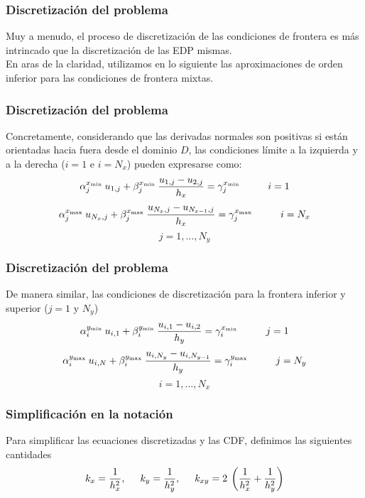 \begin{frame}
\frametitle{Discretización del problema}
Muy a menudo, el proceso de discretización de las condiciones de frontera es más intrincado que la discretización de las EDP mismas.
\\
\bigskip
En aras de la claridad, utilizamos en lo siguiente las aproximaciones de orden inferior para las condiciones de frontera mixtas.
\end{frame}
\begin{frame}
\frametitle{Discretización del problema}
Concretamente, considerando que las derivadas normales son positivas si están orientadas hacia fuera desde el dominio $D$, las condiciones límite a la izquierda y a la derecha ($i = 1$ e $i = N_{x}$) pueden expresarse como:
\[ \alpha_{j}^{x_{\text{\tiny{min}}}} \: u_{1, j} + \beta_{j}^{x_{\text{\tiny{min}}}} \: \dfrac{u_{1, j} - u_{2, j}}{h_{x}} = \gamma_{j}^{x_{\text{\tiny{min}}}} \hspace{1cm} i = 1  \]
\[ \alpha_{j}^{x_{\mbox{\tiny{max}}}} \: u_{N_{x}, j} + \beta_{j}^{x_{\text{\tiny{max}}}} \: \dfrac{u_{N_{x}, j} - u_{N_{x-1}, j}}{h_{x}} = \gamma_{j}^{x_{\text{\tiny{max}}}} \hspace{1cm} i = N_{x} \]
\[ j = 1, \ldots, N_{y}  \]
\end{frame}
\begin{frame}
\frametitle{Discretización del problema}
De manera similar, las condiciones de discretización para la frontera inferior y superior ($j = 1$ y $N_{y}$)
\[ \alpha_{i}^{y_{\text{\tiny{min}}}} \: u_{i, 1} + \beta_{i}^{y_{\text{\tiny{min}}}} \: \dfrac{u_{i, 1} - u_{i, 2}}{h_{y}} = \gamma_{i}^{x_{\text{\tiny{min}}}} \hspace{1cm} j = 1  \]
\[ \alpha_{i}^{y_{\text{\tiny{max}}}} \: u_{i, N} + \beta_{i}^{y_{\text{\tiny{max}}}} \: \dfrac{u_{i, N_{y}} - u_{i, N_{y-1}}}{h_{y}} = \gamma_{i}^{y_{\text{\tiny{max}}}} \hspace{1cm} j = N_{y} \]
\[ i = 1, \ldots, N_{x}  \]
\end{frame}
\begin{frame}
\frametitle{Simplificación en la notación}
Para simplificar las ecuaciones discretizadas y las CDF, definimos las siguientes cantidades
\begin{equation}
k_{x} = \dfrac{1}{h_{x}^{2}}, \hspace{0.5cm} k_{y} = \dfrac{1}{h_{y}^{2}}, \hspace{0.5cm} k_{xy} = 2 \: \left( \dfrac{1}{h_{x}^{2}} + \dfrac{1}{h_{y}^{2}} \right)
\label{eq:ecuacion_13_07}
\end{equation}
\end{frame}
